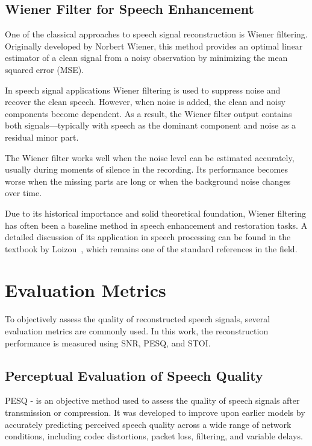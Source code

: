 \section{Wiener Filter for Speech Enhancement}

One of the classical approaches to speech signal reconstruction is Wiener filtering. Originally developed by Norbert Wiener, this method provides an optimal linear estimator of a clean signal from a noisy observation by minimizing the mean squared error (MSE).


In speech signal applications Wiener filtering is used to suppress noise and recover the clean speech. However, when noise is added, the clean and noisy components become dependent. As a result, the Wiener filter output contains both signals—typically with speech as the dominant component and noise as a residual minor part.

The Wiener filter works well when the noise level can be estimated accurately, usually during moments of silence in the recording. Its performance becomes worse when the missing parts are long or when the background noise changes over time. \cite{reddy}


Due to its historical importance and solid theoretical foundation, Wiener filtering has often been a baseline method in speech enhancement and restoration tasks. A detailed discussion of its application in speech processing can be found in the textbook by Loizou~\cite{loizou}, which remains one of the standard references in the field.

\chapter{Evaluation Metrics}

To objectively assess the quality of reconstructed speech signals, several evaluation metrics are commonly used. In this work, the reconstruction performance is measured using SNR, PESQ, and STOI.

\section{Perceptual Evaluation of Speech Quality}
PESQ - is an objective method used to assess the quality of speech signals after transmission or compression. It was developed to improve upon earlier models by accurately predicting perceived speech quality across a wide range of network conditions, including codec distortions, packet loss, filtering, and variable delays.

